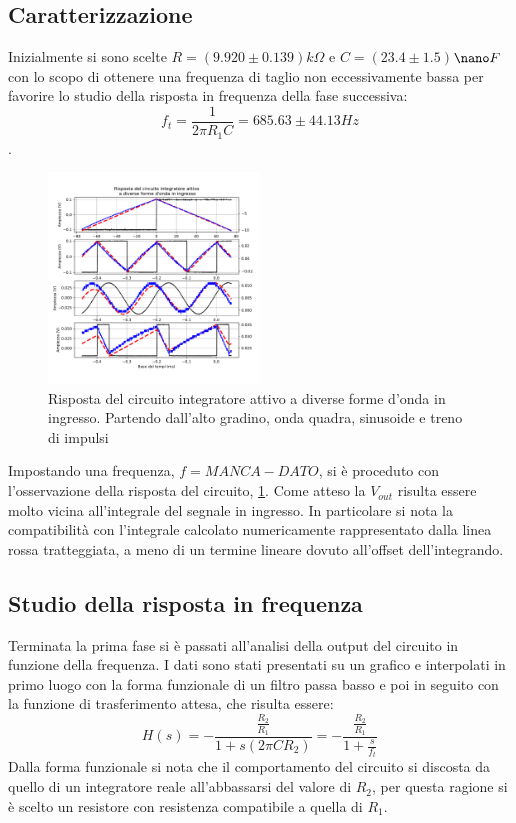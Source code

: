 \documentclass[journal]{IEEEtran}
\begin{document}
\subsection{\textbf{Caratterizzazione}}
Inizialmente si sono scelte $R =$$(9.920 \pm 0.139)$$k\Omega$ e $C=$$(23.4 \pm 1.5)$$\nano F$ con lo scopo di ottenere una frequenza di taglio non eccessivamente bassa per favorire lo studio della risposta in frequenza della fase successiva: \[f_{t} = \frac{1}{2 \pi R_{1} C}= 685.63 \pm 44.13 Hz\].

\begin{figure}[H]%
\begin {center}
\includegraphics[width=0.50\textwidth]{analysis/output/OPA-integ-with-res.pdf}
\caption{Risposta del circuito integratore attivo a diverse forme d'onda in ingresso. Partendo dall'alto gradino, onda quadra, sinusoide e treno di impulsi}
\label{fig:OPA-integ-res}
\end {center}
\end{figure}
Impostando una frequenza, $f= MANCA-DATO$, si è proceduto con l'osservazione della risposta del circuito, \ref{fig:OPA-integ-res}. Come atteso la $V_{out}$ risulta essere molto vicina all'integrale del segnale in ingresso. In particolare si nota la compatibilità con l'integrale calcolato numericamente rappresentato dalla linea rossa tratteggiata, a meno di un termine lineare dovuto all'offset dell'integrando.
\subsection{\textbf{Studio della risposta in frequenza}}

Terminata la prima fase si è passati all'analisi della output del circuito in funzione della frequenza. I dati sono stati presentati su un grafico e interpolati in primo luogo con la forma funzionale di un filtro passa basso e poi in seguito con la funzione di trasferimento attesa, che risulta essere: 
\[H(s) = -\frac{\frac{R_2}{R_1}}{1 + s(2 \pi C R_2)} = -\frac{\frac{R_2}{R_1}}{1 + \frac{s}{f_t}}\]
Dalla forma funzionale si nota che il comportamento del circuito si discosta da quello di un integratore reale all'abbassarsi del valore di $R_2$, per questa ragione si è scelto un resistore con resistenza compatibile a quella di $R_1$.
\end{document}
